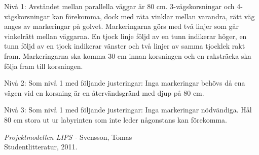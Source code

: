 \documentclass[a4paper,12pt]{article}
\begin{document}
\begin{list}{*}{}
\item Nivå 1: Avståndet mellan parallella väggar är 80 cm. 3-vägskorsningar och 4-vägskorsningar kan förekomma, dock med räta vinklar mellan varandra, rätt väg anges av markeringar på golvet. Markeringarna görs med två linjer som går vinkelrätt mellan väggarna. En tjock linje följd av en tunn indikerar höger, en tunn följd av en tjock indikerar vänster och två linjer av samma tjocklek rakt fram. Markeringarna ska komma 30 cm innan korsningen och en raksträcka ska följa fram till korsningen. 
\item Nivå 2: Som nivå 1 med följande justeringar: Inga markeringar behövs då ena vägen vid en korsning är en återvändsgränd med djup på 80 cm.
\item Nivå 3: Som nivå 1 med följande justeringar: Inga markeringar nödvändiga. Hål 80 cm stora ut ur labyrinten som inte leder någonstans kan förekomma.
\end{list} 

\newpage


\begin{thebibliography}{99}
\textit{Projektmodellen LIPS - } Svensson, Tomas
\\Studentlitteratur, 2011.
\end{thebibliography}
\end{document}

